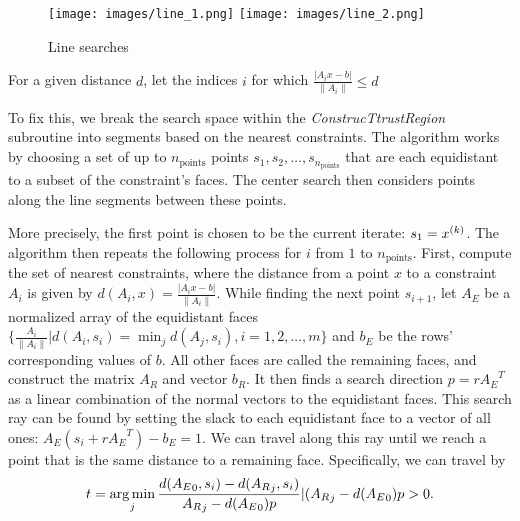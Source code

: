 \begin{figure}[h]
    \centering
    \texttt{[image: images/line\_1.png]}
    \texttt{[image: images/line\_2.png]}
    \caption{Line searches}
    \label{first_line_search}
\end{figure}


For a given distance $d$, let the indices $i$ for which $\frac {|A_i x - b|}{\|A_i\|} \le d$


To fix this, we break the search space within the \emph{ConstrucTtrustRegion} subroutine into segments based on the nearest constraints.
The algorithm works by choosing a set of up to $n_{\text{points}}$ points $s_1, s_2, \ldots, s_{n_{\text{points}}}$ that are each equidistant to a subset of the constraint's faces.
The center search then considers points along the line segments between these points.

More precisely, the first point is chosen to be the current iterate: $s_1 = {x}^{(k)}$.
The algorithm then repeats the following process for $i$ from $1$ to $n_{\text{points}}$.
First, compute the set of nearest constraints, where the distance from a point $x$ to a constraint $A_i$ is given by $d(A_i, x) = \frac {|A_i x - b|}{\|A_i\|}$.
While finding the next point $s_{i+1}$, let  $A_E$ be a normalized array of the equidistant faces $\{\frac{A_i}{\|A_i\|} | d(A_i, s_i) = \min_j d(A_j, s_i), i = 1, 2, \ldots, m\}$ and $b_E$ be the rows' corresponding values of $b$.
All other faces are called the remaining faces, and construct the matrix $A_R$ and vector $b_R$.
It then finds a search direction $p  = r{A_E}^T$ as a linear combination of the normal vectors to the equidistant faces.
This search ray can be found by setting the slack to each equidistant face to a vector of all ones: $A_E(s_i + r{A_E}^T) - b_E = 1$.
We can travel along this ray until we reach a point that is the same distance to a remaining face.
Specifically, we can travel by 
\begin{align}
t = \operatorname*{arg\,min}_j {\frac{d({A_E}_0, s_i) - d({A_R}_j, s_i)}{ {A_R}_j - d({A_E}_0) p} | ({A_R}_j - d({A_E}_0) p > 0 }. 
\end{align}

